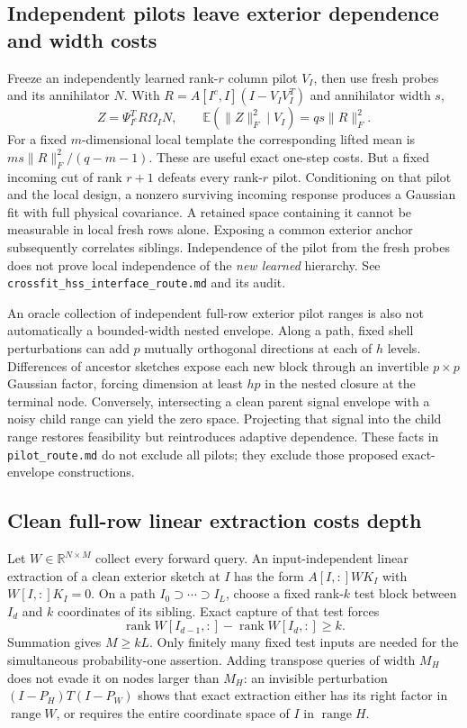 \documentclass[11pt,oneside,openany,a4paper]{report}
\numberwithin{equation}{chapter}
\theoremstyle{definition}
\theoremstyle{remark}
\newcommand{\sourcefile}[1]{{\small\nolinkurl{#1}}}
\begin{document}
\subsection{Independent pilots leave exterior dependence and width costs}

Freeze an independently learned rank-$r$ column pilot $V_I$, then use
fresh probes and its annihilator $N$.  With
$R=A[I^c,I](I-V_IV_I^T)$ and annihilator width $s$,
\[
 Z=\Psi_{I^c}^TR\Omega_I N,\qquad
 \mathbb E(\|Z\|_F^2\mid V_I)=qs\|R\|_F^2.
\]
For a fixed $m$-dimensional local template the corresponding lifted
mean is $ms\|R\|_F^2/(q-m-1)$.  These are useful exact one-step costs.
But a fixed incoming cut of rank $r+1$ defeats every rank-$r$ pilot.
Conditioning on that pilot and the local design, a nonzero surviving
incoming response produces a Gaussian fit with full physical covariance.
A retained space containing it cannot be measurable in local fresh
rows alone.  Exposing a common exterior anchor subsequently correlates
siblings.  Independence of the pilot from the fresh probes does not
prove local independence of the \emph{new learned} hierarchy.
See \sourcefile{crossfit_hss_interface_route.md} and its audit.

An oracle collection of independent full-row exterior pilot ranges is
also not automatically a bounded-width nested envelope.  Along a path,
fixed shell perturbations can add $p$ mutually orthogonal directions
at each of $h$ levels.  Differences of ancestor sketches expose each
new block through an invertible $p\times p$ Gaussian factor, forcing
dimension at least $hp$ in the nested closure at the terminal node.
Conversely, intersecting a clean parent signal envelope with a noisy
child range can yield the zero space.  Projecting that signal into the
child range restores feasibility but reintroduces adaptive dependence.
These facts in \sourcefile{pilot_route.md} do not exclude all pilots;
they exclude those proposed exact-envelope constructions.

\subsection{Clean full-row linear extraction costs depth}

Let $W\in\mathbb R^{N\times M}$ collect every forward query.  An
input-independent linear extraction of a clean exterior sketch at $I$
has the form $A[I,:]WK_I$ with $W[I,:]K_I=0$.  On a path
$I_0\supset\cdots\supset I_L$, choose a fixed rank-$k$ test block
between $I_d$ and $k$ coordinates of its sibling.  Exact capture of
that test forces
\[
 \operatorname{rank}W[I_{d-1},:]
  -\operatorname{rank}W[I_d,:]\ge k.
\]
Summation gives $M\ge kL$.  Only finitely many fixed test inputs are
needed for the simultaneous probability-one assertion.  Adding
transpose queries of width $M_H$ does not evade it on nodes larger
than $M_H$: an invisible perturbation
$(I-P_H)T(I-P_W)$ shows that exact extraction either has its right
factor in $\operatorname{range}W$, or requires the entire coordinate
space of $I$ in $\operatorname{range}H$.
\end{document}
